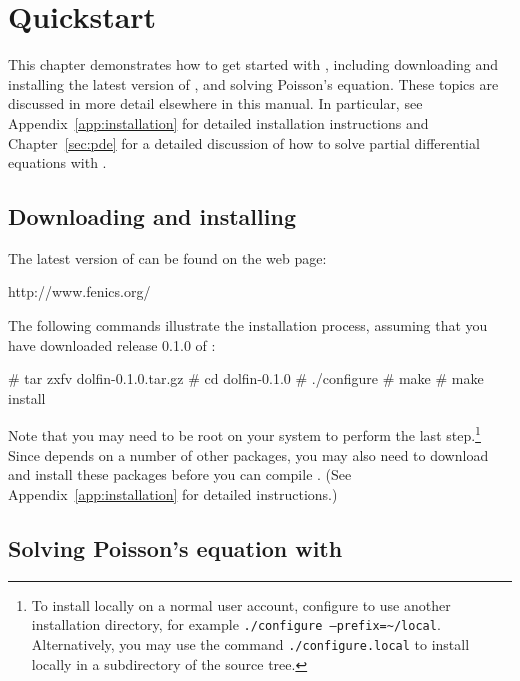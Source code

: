 \chapter{Quickstart}
\label{chap:quickstart}

This chapter demonstrates how to get started with \dolfin{}, including
downloading and installing the latest version of \dolfin{}, and solving
Poisson's equation. These topics are discussed in more detail
elsewhere in this manual. In particular, see
Appendix~\ref{app:installation} for detailed installation instructions
and Chapter~\ref{sec:pde} for a detailed discussion of how to solve
partial differential equations with \dolfin{}.

\section{Downloading and installing \dolfin{}}

The latest version of \dolfin{} can be found on the \fenics{} web page:
\begin{code}
http://www.fenics.org/
\end{code}
The following commands illustrate the installation process, assuming
that you have downloaded release 0.1.0 of \dolfin{}:
\begin{code}
# tar zxfv dolfin-0.1.0.tar.gz
# cd dolfin-0.1.0
# ./configure
# make
# make install
\end{code}

Note that you may need to be root on your system to perform the last
step.\footnote{To install \dolfin{} locally on a normal user account,
configure \dolfin{} to use another installation directory, for example
\texttt{./configure --prefix=\~{}/local}. Alternatively, you may use the
command \texttt{./configure.local} to install \dolfin{} locally in a
subdirectory of the source tree.}  Since \dolfin{} depends on a number
of other packages, you may also need to download and install these
packages before you can compile \dolfin{}.  (See
Appendix~\ref{app:installation} for detailed instructions.)

\section{Solving Poisson's equation with \dolfin{}}

